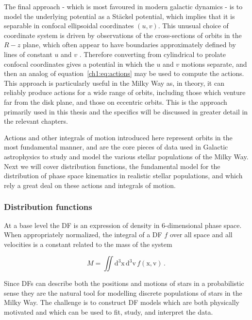 The final approach - which is most favoured in modern galactic dynamics - is to model the underlying potential as a St\"{a}ckel potential, which implies that it is separable in confocal ellipsoidal coordinates $(u,v)$. This unusual choice of coordinate system is driven by observations of the cross-sections of orbits in the $R-z$ plane, which often appear to have boundaries approximately defined by lines of constant $u$ and $v$ \parencite[see figure 3.27 in ][]{binney08}. Therefore converting from cylindrical to prolate confocal coordinates gives a potential in which the $u$ and $v$ motions separate, and then an analog of equation~\eqref{ch1:eq:actions} may be used to compute the actions. This approach is particularly useful in the Milky Way as, in theory, it can reliably produce actions for a wide range of orbits, including those which venture far from the disk plane, and those on eccentric orbits. This is the approach primarily used in this thesis and the specifics will be discussed in greater detail in the relevant chapters.

Actions and other integrals of motion introduced here represent orbits in the most fundamental manner, and are the core pieces of data used in Galactic astrophysics to study and model the various stellar populations of the Milky Way. Next we will cover distribution functions, the fundamental model for the distribution of phase space kinematics in realistic stellar populations, and which rely a great deal on these actions and integrals of motion.

\subsubsection{Distribution functions}

At a base level the DF is an expression of density in 6-dimensional phase space. When appropriately normalized, the integral of a DF $f$ over all space and all velocities is a constant related to the mass of the system

\begin{equation}
    \label{ch1:eq:df-normalization}
    M = \iint \mathrm{d}^3\mathbf{\mathrm{x}}\, \mathrm{d}^3\mathbf{\mathrm{v}}\, f( \mathbf{\mathrm{x}}, \mathbf{\mathrm{v}}) \,.
\end{equation}

\noindent Since DFs can describe both the positions and motions of stars in a probabilistic sense they are the natural tool for modelling discrete populations of stars in the Milky Way. The challenge is to construct DF models which are both physically motivated and which can be used to fit, study, and interpret the data.

